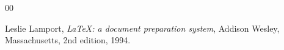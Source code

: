 \documentclass[preprint,12pt,authoryear]{elsarticle}
\begin{document}


\begin{thebibliography}{00}


  Leslie Lamport,
  \textit{\LaTeX: a document preparation system},
  Addison Wesley, Massachusetts,
  2nd edition,
  1994.




\end{thebibliography}
\end{document}
